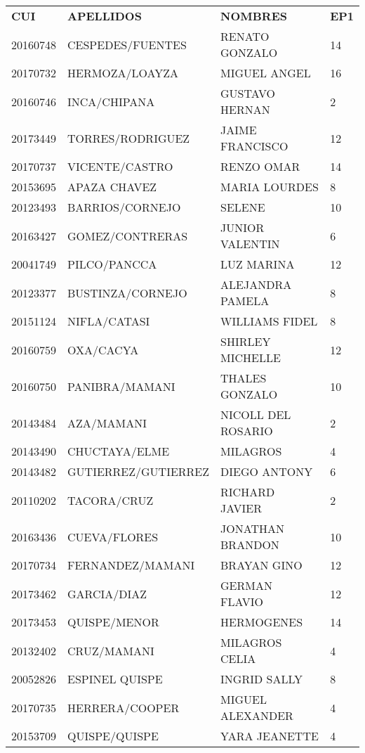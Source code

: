 \begin{table}[H]
	\begin{tabular}{llll}
		\textbf{CUI}      & \textbf{APELLIDOS}           & \textbf{NOMBRES}            & \textbf{EP1} \\
		20160748 & CESPEDES/FUENTES    & RENATO GONZALO     & 14  \\
		20170732 & HERMOZA/LOAYZA      & MIGUEL ANGEL       & 16  \\
		20160746 & INCA/CHIPANA        & GUSTAVO HERNAN     & 2   \\
		20173449 & TORRES/RODRIGUEZ    & JAIME FRANCISCO    & 12  \\
		20170737 & VICENTE/CASTRO      & RENZO OMAR         & 14  \\
		20153695 & APAZA CHAVEZ        & MARIA LOURDES      & 8   \\
		20123493 & BARRIOS/CORNEJO     & SELENE             & 10  \\
		20163427 & GOMEZ/CONTRERAS     & JUNIOR VALENTIN    & 6   \\
		20041749 & PILCO/PANCCA        & LUZ MARINA         & 12  \\
		20123377 & BUSTINZA/CORNEJO    & ALEJANDRA PAMELA   & 8   \\
		20151124 & NIFLA/CATASI        & WILLIAMS FIDEL     & 8   \\
		20160759 & OXA/CACYA           & SHIRLEY MICHELLE   & 12  \\
		20160750 & PANIBRA/MAMANI      & THALES GONZALO     & 10  \\
		20143484 & AZA/MAMANI          & NICOLL DEL ROSARIO & 2   \\
		20143490 & CHUCTAYA/ELME       & MILAGROS           & 4   \\
		20143482 & GUTIERREZ/GUTIERREZ & DIEGO ANTONY       & 6   \\
		20110202 & TACORA/CRUZ         & RICHARD JAVIER     & 2   \\
		20163436 & CUEVA/FLORES        & JONATHAN BRANDON   & 10  \\
		20170734 & FERNANDEZ/MAMANI    & BRAYAN GINO        & 12  \\
		20173462 & GARCIA/DIAZ         & GERMAN FLAVIO      & 12  \\
		20173453 & QUISPE/MENOR        & HERMOGENES         & 14  \\
		20132402 & CRUZ/MAMANI         & MILAGROS CELIA     & 4   \\
		20052826 & ESPINEL QUISPE      & INGRID SALLY       & 8   \\
		20170735 & HERRERA/COOPER      & MIGUEL ALEXANDER   & 4   \\
		20153709 & QUISPE/QUISPE       & YARA JEANETTE      & 4  
	\end{tabular}
\end{table}

